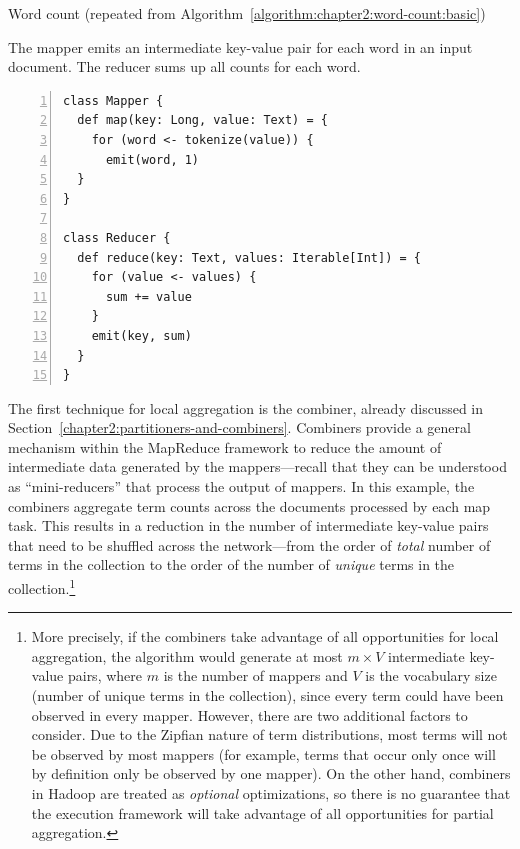 \begin{algorithm}[t]
\caption{Word count (repeated from Algorithm~\ref{algorithm:chapter2:word-count:basic})}
\label{algorithm:chapter3:word-count:basic}
The mapper emits an intermediate key-value pair for each word in an
input document. The reducer sums up all counts for each word.
\begin{small}
\begin{Verbatim}[numbers=left, xleftmargin=7.5mm]
class Mapper {
  def map(key: Long, value: Text) = {
    for (word <- tokenize(value)) {
      emit(word, 1)
  }
}

class Reducer {
  def reduce(key: Text, values: Iterable[Int]) = {
    for (value <- values) {
      sum += value
    }
    emit(key, sum)
  }
}
\end{Verbatim}
\end{small}
\end{algorithm}

The first technique for local aggregation is the combiner, already
discussed in Section~\ref{chapter2:partitioners-and-combiners}.
Combiners provide a general mechanism within the MapReduce framework
to reduce the amount of intermediate data generated by the
mappers---recall that they can be understood as ``mini-reducers'' that
process the output of mappers.  In this example, the combiners
aggregate term counts across the documents processed by each map task.
This results in a reduction in the number of intermediate key-value
pairs that need to be shuffled across the network---from the order of
\emph{total} number of terms in the collection to the order of the
number of \emph{unique} terms in the collection.\footnote{More
  precisely, if the combiners take advantage of all opportunities for
  local aggregation, the algorithm would generate at most $m \times V$
  intermediate key-value pairs, where $m$ is the number of mappers and
  $V$ is the vocabulary size (number of unique terms in the
  collection), since every term could have been observed in every
  mapper.  However, there are two additional factors to consider.  Due
  to the Zipfian nature of term distributions, most terms will not be
  observed by most mappers (for example, terms that occur only once
  will by definition only be observed by one mapper).  On the other
  hand, combiners in Hadoop are treated as \emph{optional}
  optimizations, so there is no guarantee that the execution framework
  will take advantage of all opportunities for partial aggregation.}

